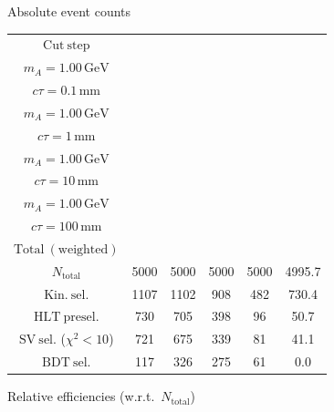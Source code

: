 \documentclass[10pt,a4paper]{article}
\renewcommand{\arraystretch}{1.4}
\begin{document}
{\footnotesize\setlength{\tabcolsep}{4pt}\renewcommand{\arraystretch}{1.05}%
\vspace{12pt}

Absolute event counts

\begin{tabular}{cccccc}
\toprule
$\mathrm{Cut\ step}$ & \shortstack{$m_{\pi}=10\,\mathrm{GeV}$\\$m_{A}=1.00\,\mathrm{GeV}$\\$c\tau=0.1\,\mathrm{mm}$} & \shortstack{$m_{\pi}=10\,\mathrm{GeV}$\\$m_{A}=1.00\,\mathrm{GeV}$\\$c\tau=1\,\mathrm{mm}$} & \shortstack{$m_{\pi}=10\,\mathrm{GeV}$\\$m_{A}=1.00\,\mathrm{GeV}$\\$c\tau=10\,\mathrm{mm}$} & \shortstack{$m_{\pi}=10\,\mathrm{GeV}$\\$m_{A}=1.00\,\mathrm{GeV}$\\$c\tau=100\,\mathrm{mm}$} & \shortstack{$\mathrm{QCD}$\\$\mathrm{Total\ (weighted)}$} \\
\midrule
$N_{\mathrm{total}}$ & 5000 & 5000 & 5000 & 5000 & 4995.7\\
$\mathrm{Kin.\ sel.}$ & 1107 & 1102 & 908 & 482 & 730.4\\
$\mathrm{HLT\ presel.}$ & 730 & 705 & 398 & 96 & 50.7\\
$\mathrm{SV\ sel.}$ ($\chi^2{<}10$) & 721 & 675 & 339 & 81 & 41.1\\
$\mathrm{BDT\ sel.}$ & 117 & 326 & 275 & 61 & 0.0\\
\bottomrule
\end{tabular}

\vspace{18pt}

Relative efficiencies (w.r.t.\ $N_{\mathrm{total}}$)

}
\end{document}
